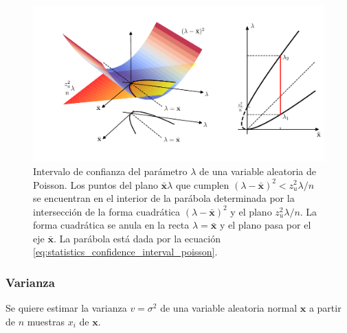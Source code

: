 \documentclass[a4paper]{report}
\newcommand{\x}{\mathbf{x}}
\begin{document}
\begin{figure}[!htb]
\begin{center}
\includegraphics[width=1\columnwidth]{figuras/poisson_confidence_interval_v3.pdf}
\caption{\label{fig:poisson_confidence_interval_v3} Intervalo de confianza del parámetro \(\lambda\) de una variable aleatoria de Poisson. Los puntos del plano \(\bar{\x}\lambda\) que cumplen \((\lambda-\bar{\x})^2<z_u^2\lambda/n\) se encuentran en el interior de la parábola determinada por la intersección de la forma cuadrática \((\lambda-\bar{\x})^2\) y el plano \(z_u^2\lambda/n\). La forma cuadrática se anula en la recta \(\lambda=\bar{\x}\) y el plano pasa por el eje \(\bar{\x}\). La parábola está dada por la ecuación \ref{eq:statistics_confidence_interval_poisson}.}
\end{center}
\end{figure}

\subsubsection{Varianza}

Se quiere estimar la varianza \(v=\sigma^2\) de una variable aleatoria normal \(\x\) a partir de \(n\) muestras \(x_i\) de \(\x\).
\end{document}
